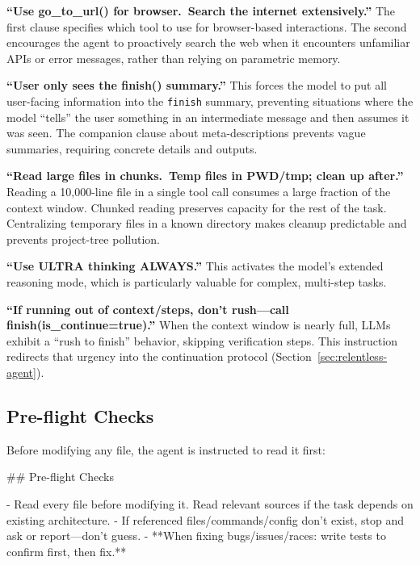 \documentclass{article}
\begin{document}
\textbf{``Use go\_to\_url() for browser.\ Search the internet extensively.''}  The first clause specifies which tool to use for browser-based interactions.  The second encourages the agent to proactively search the web when it encounters unfamiliar APIs or error messages, rather than relying on parametric memory.

\textbf{``User only sees the finish() summary.''}  This forces the model to put all user-facing information into the \texttt{finish} summary, preventing situations where the model ``tells'' the user something in an intermediate message and then assumes it was seen.  The companion clause about meta-descriptions prevents vague summaries, requiring concrete details and outputs.

\textbf{``Read large files in chunks.\ Temp files in PWD/tmp; clean up after.''}  Reading a 10,000-line file in a single tool call consumes a large fraction of the context window.  Chunked reading preserves capacity for the rest of the task.  Centralizing temporary files in a known directory makes cleanup predictable and prevents project-tree pollution.

\textbf{``Use ULTRA thinking ALWAYS.''}  This activates the model's extended reasoning mode, which is particularly valuable for complex, multi-step tasks.

\textbf{``If running out of context/steps, don't rush---call finish(is\_continue=true).''}  When the context window is nearly full, LLMs exhibit a ``rush to finish'' behavior, skipping verification steps.  This instruction redirects that urgency into the continuation protocol (Section~\ref{sec:relentless-agent}).

\subsection{Pre-flight Checks}
\label{app:preflight}

Before modifying any file, the agent is instructed to read it first:

\begin{prompt}
## Pre-flight Checks

- Read every file before modifying it. Read relevant sources if the task depends on existing architecture.
- If referenced files/commands/config don't exist, stop and ask or report---don't guess.
- **When fixing bugs/issues/races: write tests to confirm first, then fix.**
\end{prompt}
\end{document}
